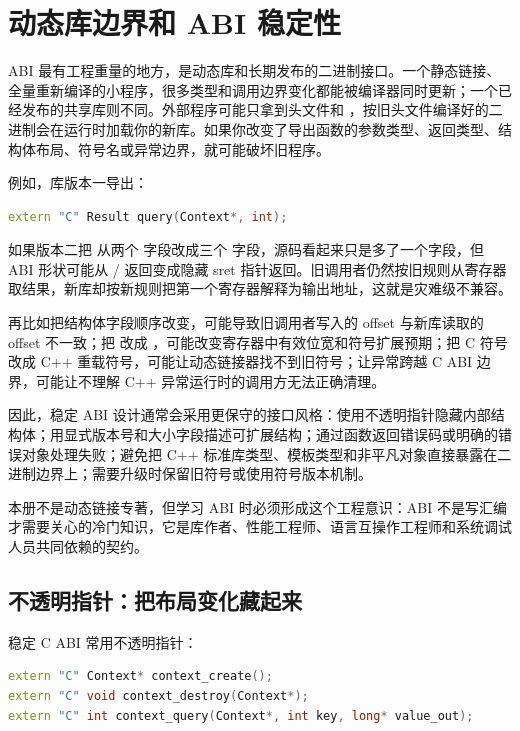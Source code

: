 \section{动态库边界和 ABI 稳定性}

ABI 最有工程重量的地方，是动态库和长期发布的二进制接口。一个静态链接、全量重新编译的小程序，很多类型和调用边界变化都能被编译器同时更新；一个已经发布的共享库则不同。外部程序可能只拿到头文件和 ，按旧头文件编译好的二进制会在运行时加载你的新库。如果你改变了导出函数的参数类型、返回类型、结构体布局、符号名或异常边界，就可能破坏旧程序。

例如，库版本一导出：

\begin{lstlisting}[language=C++]
extern "C" Result query(Context*, int);
\end{lstlisting}

如果版本二把  从两个  字段改成三个  字段，源码看起来只是多了一个字段，但 ABI 形状可能从 / 返回变成隐藏 sret 指针返回。旧调用者仍然按旧规则从寄存器取结果，新库却按新规则把第一个寄存器解释为输出地址，这就是灾难级不兼容。

再比如把结构体字段顺序改变，可能导致旧调用者写入的 offset 与新库读取的 offset 不一致；把  改成 ，可能改变寄存器中有效位宽和符号扩展预期；把 C 符号改成 C++ 重载符号，可能让动态链接器找不到旧符号；让异常跨越 C ABI 边界，可能让不理解 C++ 异常运行时的调用方无法正确清理。

因此，稳定 ABI 设计通常会采用更保守的接口风格：使用不透明指针隐藏内部结构体；用显式版本号和大小字段描述可扩展结构；通过函数返回错误码或明确的错误对象处理失败；避免把 C++ 标准库类型、模板类型和非平凡对象直接暴露在二进制边界上；需要升级时保留旧符号或使用符号版本机制。

本册不是动态链接专著，但学习 ABI 时必须形成这个工程意识：ABI 不是写汇编才需要关心的冷门知识，它是库作者、性能工程师、语言互操作工程师和系统调试人员共同依赖的契约。

\subsection{不透明指针：把布局变化藏起来}

稳定 C ABI 常用不透明指针：

\begin{lstlisting}[language=C++]
extern "C" Context* context_create();
extern "C" void context_destroy(Context*);
extern "C" int context_query(Context*, int key, long* value_out);
\end{lstlisting}

